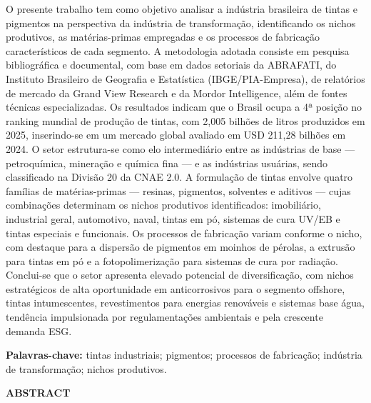 \documentclass[
  12pt,
  a4paper,
  oneside,
  brazil,
  chapter=TITLE
]{article}
\begin{document}
\vspace{1em}
\noindent
O presente trabalho tem como objetivo analisar a indústria brasileira de tintas e pigmentos
na perspectiva da indústria de transformação, identificando os nichos produtivos, as
matérias-primas empregadas e os processos de fabricação característicos de cada segmento.
A metodologia adotada consiste em pesquisa bibliográfica e documental, com base em dados
setoriais da ABRAFATI, do Instituto Brasileiro de Geografia e Estatística (IBGE/PIA-Empresa),
de relatórios de mercado da Grand View Research e da Mordor Intelligence, além de fontes
técnicas especializadas. Os resultados indicam que o Brasil ocupa a 4ª posição no ranking
mundial de produção de tintas, com 2,005 bilhões de litros produzidos em 2025, inserindo-se
em um mercado global avaliado em USD 211,28 bilhões em 2024. O setor estrutura-se como elo
intermediário entre as indústrias de base --- petroquímica, mineração e química fina --- e as
indústrias usuárias, sendo classificado na Divisão 20 da CNAE 2.0. A formulação de tintas
envolve quatro famílias de matérias-primas --- resinas, pigmentos, solventes e aditivos ---
cujas combinações determinam os nichos produtivos identificados: imobiliário, industrial
geral, automotivo, naval, tintas em pó, sistemas de cura UV/EB e tintas especiais e
funcionais. Os processos de fabricação variam conforme o nicho, com destaque para a
dispersão de pigmentos em moinhos de pérolas, a extrusão para tintas em pó e a
fotopolimerização para sistemas de cura por radiação. Conclui-se que o setor apresenta
elevado potencial de diversificação, com nichos estratégicos de alta oportunidade em
anticorrosivos para o segmento offshore, tintas intumescentes, revestimentos para energias
renováveis e sistemas base água, tendência impulsionada por regulamentações ambientais e
pela crescente demanda ESG.

\vspace{1em}
\noindent\textbf{Palavras-chave:} tintas industriais; pigmentos; processos de fabricação; indústria de transformação; nichos produtivos.

\clearpage
\thispagestyle{empty}
\begin{center}
  {\normalsize\bfseries ABSTRACT}
\end{center}
\end{document}

